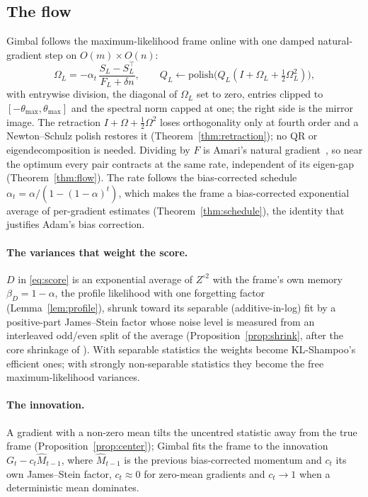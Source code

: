 \subsection{The flow}
Gimbal follows the maximum-likelihood frame online with one damped natural-gradient step on
$O(m)\times O(n)$:
\begin{equation}
  \Omega_L=-\alpha_t\,\frac{S_L-S_L^\top}{F_L+\delta n},\qquad
  Q_L\leftarrow\mathrm{polish}\big(Q_L(I+\Omega_L+\tfrac12\Omega_L^2)\big),
  \label{eq:flow}
\end{equation}
with entrywise division, the diagonal of $\Omega_L$ set to zero, entries clipped to
$[-\theta_{\max},\theta_{\max}]$ and the spectral norm capped at one; the right side is the mirror
image. The retraction $I+\Omega+\tfrac12\Omega^2$ loses orthogonality only at fourth order and a
Newton--Schulz polish restores it (Theorem~\ref{thm:retraction}); no QR or eigendecomposition is
needed. Dividing by $F$ is Amari's natural gradient~\citep{amari1998natural}, so near the optimum
every pair contracts at the same rate, independent of its eigen-gap (Theorem~\ref{thm:flow}). The
rate follows the bias-corrected schedule $\alpha_t=\alpha/(1-(1-\alpha)^t)$, which makes the frame
a bias-corrected exponential average of per-gradient estimates (Theorem~\ref{thm:schedule}), the
identity that justifies Adam's bias correction.

\paragraph{The variances that weight the score.}
$D$ in \eqref{eq:score} is an exponential average of $Z^{\circ2}$ with the frame's own memory
$\beta_D=1-\alpha$, the profile likelihood with one forgetting factor (Lemma~\ref{lem:profile}),
shrunk toward its separable (additive-in-log) fit by a positive-part James--Stein factor whose
noise level is measured from an interleaved odd/even split of the average
(Proposition~\ref{prop:shrink}, after the core shrinkage of \citet{hoff2023core}). With
separable statistics the weights become KL-Shampoo's efficient ones; with strongly non-separable
statistics they become the free maximum-likelihood variances.

\paragraph{The innovation.}
A gradient with a non-zero mean tilts the uncentred statistic away from the true frame
(Proposition~\ref{prop:center}); Gimbal fits the frame to the innovation $G_t-c_t\hat M_{t-1}$,
where $\hat M_{t-1}$ is the previous bias-corrected momentum and $c_t$ its own James--Stein factor,
$c_t\approx0$ for zero-mean gradients and $c_t\to1$ when a deterministic mean dominates.

